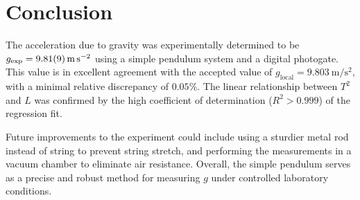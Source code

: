 \section{Conclusion}
The acceleration due to gravity was experimentally determined to be $g_{\text{exp}} = \SI{9.81 \pm 0.09}{\meter\per\second\squared}$ using a simple pendulum system and a digital photogate. This value is in excellent agreement with the accepted value of $g_{\text{local}} = \SI{9.803}{\meter\per\second\squared}$, with a minimal relative discrepancy of $0.05\%$. The linear relationship between $T^2$ and $L$ was confirmed by the high coefficient of determination ($R^2 > 0.999$) of the regression fit.

Future improvements to the experiment could include using a sturdier metal rod instead of string to prevent string stretch, and performing the measurements in a vacuum chamber to eliminate air resistance. Overall, the simple pendulum serves as a precise and robust method for measuring $g$ under controlled laboratory conditions.
